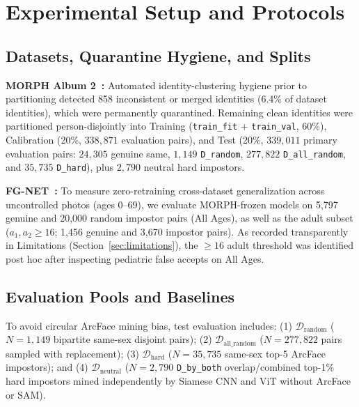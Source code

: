 \documentclass[journal]{IEEEtran}
\begin{document}
\section{Experimental Setup and Protocols}
\label{sec:setup}

\subsection{Datasets, Quarantine Hygiene, and Splits}
\textbf{MORPH Album 2~\cite{ricanek2006morph}:} Automated identity-clustering hygiene prior to partitioning detected 858 inconsistent or merged identities (6.4\% of dataset identities), which were permanently quarantined. Remaining clean identities were partitioned person-disjointly into Training (\texttt{train\_fit} + \texttt{train\_val}, 60\%), Calibration (20\%, $338{,}871$ evaluation pairs), and Test (20\%, $339{,}011$ primary evaluation pairs: $24{,}305$ genuine same, $1{,}149$ \texttt{D\_random}, $277{,}822$ \texttt{D\_all\_random}, and $35{,}735$ \texttt{D\_hard}), plus $2{,}790$ neutral hard impostors.

\textbf{FG-NET~\cite{lanitis2002fgnet}:} To measure zero-retraining cross-dataset generalization across uncontrolled photos (ages 0--69), we evaluate MORPH-frozen models on 5,797 genuine and 20,000 random impostor pairs (All Ages), as well as the adult subset ($a_1, a_2 \ge 16$; 1,456 genuine and 3,670 impostor pairs). As recorded transparently in Limitations (Section~\ref{sec:limitations}), the $\ge 16$ adult threshold was identified post hoc after inspecting pediatric false accepts on All Ages.

\subsection{Evaluation Pools and Baselines}
To avoid circular ArcFace mining bias, test evaluation includes: (1) $\mathcal{D}_{\text{random}}$ ($N=1{,}149$ bipartite same-sex disjoint pairs); (2) $\mathcal{D}_{\text{all\_random}}$ ($N=277{,}822$ pairs sampled with replacement); (3) $\mathcal{D}_{\text{hard}}$ ($N=35{,}735$ same-sex top-5 ArcFace impostors); and (4) $\mathcal{D}_{\text{neutral}}$ ($N=2{,}790$ \texttt{D\_by\_both} overlap/combined top-1\% hard impostors mined independently by Siamese CNN and ViT without ArcFace or SAM).
\end{document}
